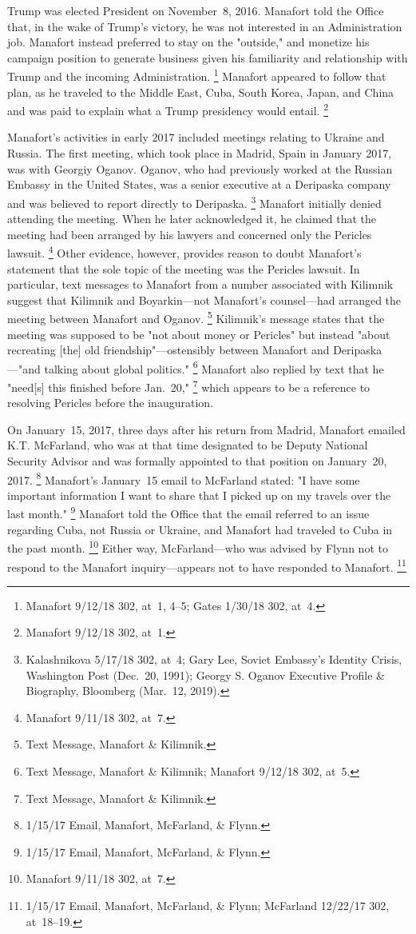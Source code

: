 Trump was elected President on November~8, 2016.
Manafort told the Office that, in the wake of Trump's victory, he was not interested in an Administration job.
Manafort instead preferred to stay on the "outside," and monetize his campaign position to generate business given his familiarity and relationship with Trump and the incoming Administration.%
\footnote{Manafort 9/12/18 302, at~1, 4--5;
Gates 1/30/18 302, at~4.}
Manafort appeared to follow that plan, as he traveled to the Middle East, Cuba, South Korea, Japan, and China and was paid to explain what a Trump presidency would entail.%
\footnote{Manafort 9/12/18 302, at~1.}

Manafort's activities in early 2017 included meetings relating to Ukraine and Russia.
The first meeting, which took place in Madrid, Spain in January 2017, was with Georgiy Oganov.
Oganov, who had previously worked at the Russian Embassy in the United States, was a senior executive at a Deripaska company and was believed to report directly to Deripaska.%
\footnote{Kalashnikova 5/17/18 302, at~4;
Gary Lee, Soviet Embassy's Identity Crisis, Washington Post (Dec.~20, 1991);
Georgy S. Oganov Executive Profile \& Biography, Bloomberg (Mar.~12, 2019).}
Manafort initially denied attending the meeting.
When he later acknowledged it, he claimed that the meeting had been arranged by his lawyers and concerned only the Pericles lawsuit.%
\footnote{Manafort 9/11/18 302, at~7.}
Other evidence, however, provides reason to doubt Manafort's statement that the sole topic of the meeting was the Pericles lawsuit.
In particular, text messages to Manafort from a number associated with Kilimnik suggest that Kilimnik and Boyarkin---not Manafort's counsel---had arranged the meeting between Manafort and Oganov.%
\footnote{Text Message, Manafort \& Kilimnik.}
Kilimnik's message states that the meeting was supposed to be "not about money or Pericles" but instead "about recreating [the] old friendship"---ostensibly between Manafort and Deripaska---"and talking about global politics."%
\footnote{Text Message, Manafort \& Kilimnik;
Manafort 9/12/18 302, at~5.}
Manafort also replied by text that he "need[s] this finished before Jan.~20,"%
\footnote{Text Message, Manafort \& Kilimnik.}
which appears to be a reference to resolving Pericles before the inauguration.

On January~15, 2017, three days after his return from Madrid, Manafort emailed K.T. McFarland, who was at that time designated to be Deputy National Security Advisor and was formally appointed to that position on January~20, 2017.%
\footnote{1/15/17 Email, Manafort, McFarland, \& Flynn.}
Manafort's January~15 email to McFarland stated: "I have some important information I want to share that I picked up on my travels over the last month."%
\footnote{1/15/17 Email, Manafort, McFarland, \& Flynn.}
Manafort told the Office that the email referred to an issue regarding Cuba, not Russia or Ukraine, and Manafort had traveled to Cuba in the past month.%
\footnote{Manafort 9/11/18 302, at~7.}
Either way, McFarland---who was advised by Flynn not to respond to the Manafort inquiry---appears not to have responded to Manafort.%
\footnote{1/15/17 Email, Manafort, McFarland, \& Flynn;
McFarland 12/22/17 302, at~18--19.}

